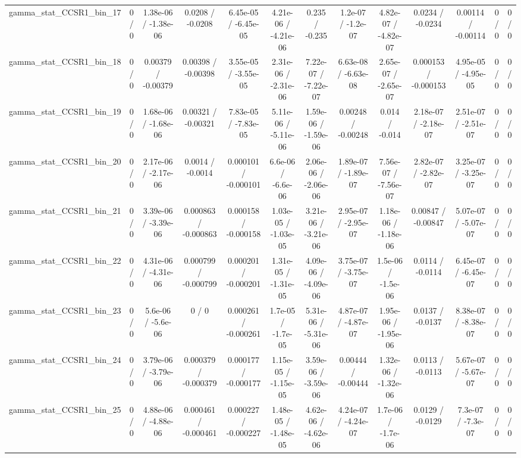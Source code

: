 \documentclass[10pt]{article}
\begin{document}
\begin{table}[htbp]
\begin{center}
\begin{tabular}{|c|c|c|c|c|c|c|c|c|c|c|c|c|}
  gamma_stat_CCSR1_bin_17 & 0 / 0 & 1.38e-06 / -1.38e-06 & 0.0208 / -0.0208 & 6.45e-05 / -6.45e-05 & 4.21e-06 / -4.21e-06 & 0.235 / -0.235 & 1.2e-07 / -1.2e-07 & 4.82e-07 / -4.82e-07 & 0.0234 / -0.0234 & 0.00114 / -0.00114 & 0 / 0 & 0 / 0 \\ 
  gamma_stat_CCSR1_bin_18 & 0 / 0 & 0.00379 / -0.00379 & 0.00398 / -0.00398 & 3.55e-05 / -3.55e-05 & 2.31e-06 / -2.31e-06 & 7.22e-07 / -7.22e-07 & 6.63e-08 / -6.63e-08 & 2.65e-07 / -2.65e-07 & 0.000153 / -0.000153 & 4.95e-05 / -4.95e-05 & 0 / 0 & 0 / 0 \\ 
  gamma_stat_CCSR1_bin_19 & 0 / 0 & 1.68e-06 / -1.68e-06 & 0.00321 / -0.00321 & 7.83e-05 / -7.83e-05 & 5.11e-06 / -5.11e-06 & 1.59e-06 / -1.59e-06 & 0.00248 / -0.00248 & 0.014 / -0.014 & 2.18e-07 / -2.18e-07 & 2.51e-07 / -2.51e-07 & 0 / 0 & 0 / 0 \\ 
  gamma_stat_CCSR1_bin_20 & 0 / 0 & 2.17e-06 / -2.17e-06 & 0.0014 / -0.0014 & 0.000101 / -0.000101 & 6.6e-06 / -6.6e-06 & 2.06e-06 / -2.06e-06 & 1.89e-07 / -1.89e-07 & 7.56e-07 / -7.56e-07 & 2.82e-07 / -2.82e-07 & 3.25e-07 / -3.25e-07 & 0 / 0 & 0 / 0 \\ 
  gamma_stat_CCSR1_bin_21 & 0 / 0 & 3.39e-06 / -3.39e-06 & 0.000863 / -0.000863 & 0.000158 / -0.000158 & 1.03e-05 / -1.03e-05 & 3.21e-06 / -3.21e-06 & 2.95e-07 / -2.95e-07 & 1.18e-06 / -1.18e-06 & 0.00847 / -0.00847 & 5.07e-07 / -5.07e-07 & 0 / 0 & 0 / 0 \\ 
  gamma_stat_CCSR1_bin_22 & 0 / 0 & 4.31e-06 / -4.31e-06 & 0.000799 / -0.000799 & 0.000201 / -0.000201 & 1.31e-05 / -1.31e-05 & 4.09e-06 / -4.09e-06 & 3.75e-07 / -3.75e-07 & 1.5e-06 / -1.5e-06 & 0.0114 / -0.0114 & 6.45e-07 / -6.45e-07 & 0 / 0 & 0 / 0 \\ 
  gamma_stat_CCSR1_bin_23 & 0 / 0 & 5.6e-06 / -5.6e-06 & 0 / 0 & 0.000261 / -0.000261 & 1.7e-05 / -1.7e-05 & 5.31e-06 / -5.31e-06 & 4.87e-07 / -4.87e-07 & 1.95e-06 / -1.95e-06 & 0.0137 / -0.0137 & 8.38e-07 / -8.38e-07 & 0 / 0 & 0 / 0 \\ 
  gamma_stat_CCSR1_bin_24 & 0 / 0 & 3.79e-06 / -3.79e-06 & 0.000379 / -0.000379 & 0.000177 / -0.000177 & 1.15e-05 / -1.15e-05 & 3.59e-06 / -3.59e-06 & 0.00444 / -0.00444 & 1.32e-06 / -1.32e-06 & 0.0113 / -0.0113 & 5.67e-07 / -5.67e-07 & 0 / 0 & 0 / 0 \\ 
  gamma_stat_CCSR1_bin_25 & 0 / 0 & 4.88e-06 / -4.88e-06 & 0.000461 / -0.000461 & 0.000227 / -0.000227 & 1.48e-05 / -1.48e-05 & 4.62e-06 / -4.62e-06 & 4.24e-07 / -4.24e-07 & 1.7e-06 / -1.7e-06 & 0.0129 / -0.0129 & 7.3e-07 / -7.3e-07 & 0 / 0 & 0 / 0 \\ 

\end{tabular}
\end{center}
\end{table}
\end{document}
